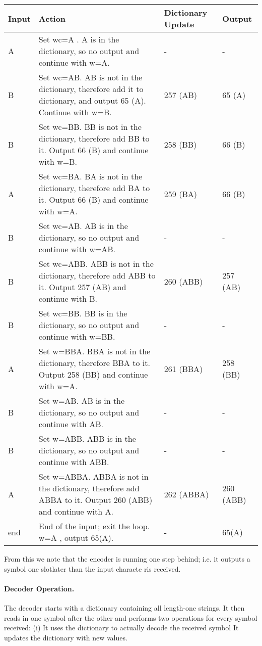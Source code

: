 \begin{longtabu} to \textwidth {
    |X[1,c]|X[5,l]|X[1,c]|X[1,c]|}
  \hline Input & Action & Dictionary Update & Output \\ \hline
  A & Set wc=A . A is in the dictionary, so no output and continue with w=A. & - & - \\ \hline
  B & Set wc=AB. AB is not in the dictionary, therefore add it to dictionary, and output 65 (A). Continue with w=B. & 257 (AB) & 65 (A) \\ \hline
  B & Set wc=BB. BB is not in the dictionary, therefore add BB to it. Output 66 (B) and continue with w=B. & 258 (BB) & 66 (B) \\ \hline
  A & Set wc=BA. BA is not in the dictionary, therefore add BA to it. Output 66 (B) and continue with w=A. & 259 (BA) & 66 (B) \\ \hline
  B & Set wc=AB. AB is in the dictionary, so no output and  continue with w=AB. & - & - \\ \hline
  B & Set wc=ABB. ABB is not in the dictionary, therefore add ABB to it. Output 257 (AB) and continue with B. & 260 (ABB) & 257 (AB) \\ \hline
  B & Set wc=BB. BB is in the dictionary, so no output and continue with w=BB. & - & - \\ \hline
  A & Set w=BBA. BBA is not in the dictionary, therefore BBA to it. Output 258 (BB) and continue with w=A. & 261 (BBA) & 258 (BB) \\ \hline
  B & Set w=AB. AB is in the dictionary, so no output and continue with AB. & - & - \\ \hline
  B & Set w=ABB. ABB is in the dictionary, so no output and continue with ABB. & - & - \\ \hline
  A & Set w=ABBA. ABBA is not in the dictionary, therefore add ABBA to it. Output 260 (ABB) and continue with A. & 262 (ABBA) & 260 (ABB) \\ \hline
  end & End of the input; exit the loop. w=A , output 65(A). & - & 65(A) \\ \hline
\end{longtabu}

From this we note that the encoder is running one step behind; i.e. it outputs a symbol one slotlater than the input characte ris received. 


\paragraph{Decoder Operation.} The decoder starts with a dictionary containing all length-one strings. It then reads in one symbol after the other and performs two operations for every symbol received: (i) It uses the dictionary to actually decode the received symbol
It updates the dictionary with new values.

